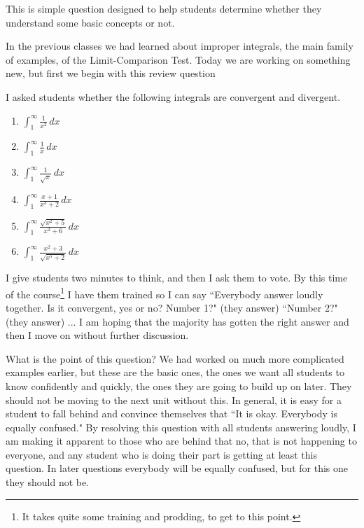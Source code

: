 \documentclass[11pt]{article}
\newcommand {\DS} [1] {${\displaystyle #1}$}
\begin{document}
\begin{example}
This is simple question designed to help students determine whether they understand some basic concepts or not.
\begin{background}
In the previous classes we had learned about improper integrals, the main family of examples, of the Limit-Comparison Test.  Today we are working on something new, but first we begin with this review question
\end{background}
\begin{question}
I asked students whether the following integrals are convergent and divergent.
%
\begin{center}
\begin{minipage}{0.7\textwidth}
\begin{multicols}{2}
\begin{enumerate}
\item \DS{\int_1^\infty \frac{1}{x^2} \, dx}
\item \DS{\int_1^\infty \frac{1}{x} \, dx}
\item \DS{\int_1^\infty \frac{1}{\sqrt{x}} \, dx}
\item \DS{\int_1^\infty \frac{x+1}{x^3+2} \, dx}
\item \DS{\int_1^\infty \frac{\sqrt{x^2+5}}{x^2+6} \, dx}
\item \DS{\int_1^\infty \frac{x^2+3}{\sqrt{x^5+2}} \, dx}
\end{enumerate}
\end{multicols}
\end{minipage}
\end{center}
\vspace{1mm}
\end{question}

\begin{comments}
{\baselineskip
I give students two minutes to think, and then I ask them to vote.  By this time of the course\footnote{It takes quite some training and prodding, to get to this point.} I have them trained so I can say ``Everybody answer loudly together.  Is it convergent, yes or no?  Number 1?" (they answer) ``Number 2?" (they answer) ...   I am hoping that the majority has gotten the right answer and then I move on without further discussion.

What is the point of this question?  We had worked on much more complicated examples earlier, but these are the basic ones, the ones we want all students to know confidently and quickly, the ones they are going to build up on later.   They should not be moving to the next unit without this.  In general, it is easy for a student to fall behind and convince themselves that ``It is okay.  Everybody is equally confused."  By resolving this question with all students answering loudly, I am making it apparent to those who are behind that no, that is not happening to everyone, and any student who is doing their part is getting at least this question.  In later questions everybody will be equally confused, but for this one they should not be.

}
\end{comments}
\end{example}
\end{document}
